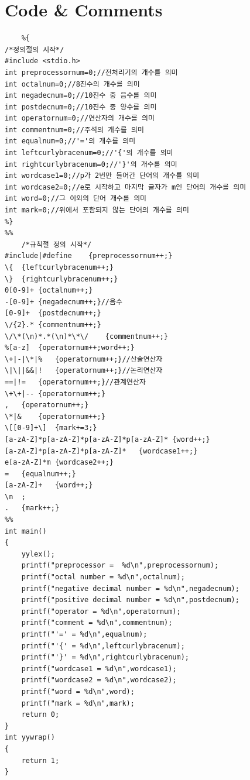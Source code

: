 \documentclass{article}
\begin{document}
\section{Code \& Comments}
\begin{verbatim}
    %{
/*정의절의 시작*/
#include <stdio.h>
int preprocessornum=0;//전처리기의 개수를 의미
int octalnum=0;//8진수의 개수를 의미
int negadecnum=0;//10진수 중 음수를 의미
int postdecnum=0;//10진수 중 양수를 의미
int operatornum=0;//연산자의 개수를 의미
int commentnum=0;//주석의 개수를 의미
int equalnum=0;//'='의 개수를 의미
int leftcurlybracenum=0;//'{'의 개수를 의미
int rightcurlybracenum=0;//'}'의 개수를 의미
int wordcase1=0;//p가 2번만 들어간 단어의 개수를 의미
int wordcase2=0;//e로 시작하고 마지막 글자가 m인 단어의 개수를 의미
int word=0;//그 이외의 단어 개수를 의미
int mark=0;//위에서 포함되지 않는 단어의 개수를 의미
%}
%%
	/*규칙절 정의 시작*/
#include|#define	{preprocessornum++;}
\{	{leftcurlybracenum++;}
\}	{rightcurlybracenum++;}
0[0-9]+	{octalnum++;}
-[0-9]+	{negadecnum++;}//음수
[0-9]+	{postdecnum++;}
\/{2}.*	{commentnum++;}
\/\*(\n)*.*(\n)*\*\/	{commentnum++;}
%[a-z]	{operatornum++;word++;}
\+|-|\*|%	{operatornum++;}//산술연산자
\|\||&&|!	{operatornum++;}//논리연산자
==|!=	{operatornum++;}//관계연산자
\+\+|--	{operatornum++;}
,	{operatornum++;}
\*|&	{operatornum++;}
\[[0-9]+\]	{mark+=3;}
[a-zA-Z]*p[a-zA-Z]*p[a-zA-Z]*p[a-zA-Z]*	{word++;}
[a-zA-Z]*p[a-zA-Z]*p[a-zA-Z]*	{wordcase1++;}
e[a-zA-Z]*m	{wordcase2++;}
=	{equalnum++;}
[a-zA-Z]+	{word++;} 
\n	;
.	{mark++;}
%%
int main()
{
	yylex();
	printf("preprocessor =  %d\n",preprocessornum);
	printf("octal number = %d\n",octalnum);
	printf("negative decimal number = %d\n",negadecnum);
	printf("positive decimal number = %d\n",postdecnum);
	printf("operator = %d\n",operatornum);
	printf("comment = %d\n",commentnum);
	printf("'=' = %d\n",equalnum);
	printf("'{' = %d\n",leftcurlybracenum);
	printf("'}' = %d\n",rightcurlybracenum);
	printf("wordcase1 = %d\n",wordcase1);
	printf("wordcase2 = %d\n",wordcase2);
	printf("word = %d\n",word);
	printf("mark = %d\n",mark);
	return 0;
}
int yywrap()
{
	return 1;
}

\end{verbatim}
\end{document}
